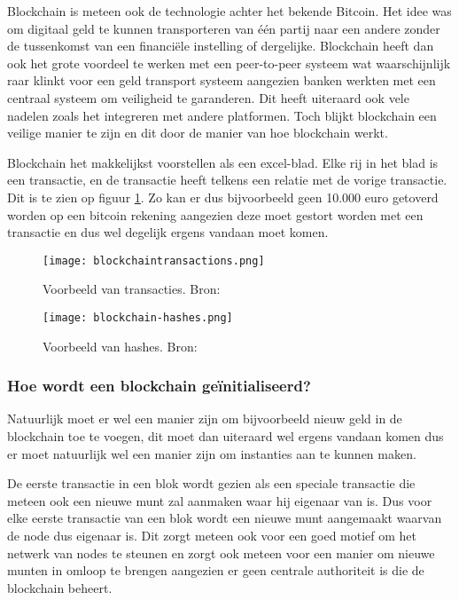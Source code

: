  Blockchain is meteen ook de technologie achter het bekende Bitcoin. Het idee was om digitaal geld te kunnen transporteren van één partij naar een andere zonder de tussenkomst van een financiële instelling of dergelijke. Blockchain heeft dan ook het grote voordeel te werken met een peer-to-peer systeem wat waarschijnlijk raar klinkt voor een geld transport systeem aangezien banken werkten met een centraal systeem om veiligheid te garanderen. Dit heeft uiteraard ook vele nadelen zoals het integreren met andere platformen. Toch blijkt blockchain een veilige manier te zijn en dit door de manier van hoe blockchain werkt.
 
 Blockchain het makkelijkst voorstellen als een excel-blad. Elke rij in het blad is een transactie, en de transactie heeft telkens een relatie met de vorige transactie. Dit is te zien op figuur \ref{fig:blockchain-transaction-example}. Zo kan er dus bijvoorbeeld geen 10.000 euro getoverd worden op een bitcoin rekening aangezien deze moet gestort worden met een transactie en dus wel degelijk ergens vandaan moet komen.
 
 \begin{figure}
 	\texttt{[image: blockchaintransactions.png]}
 	\caption{Voorbeeld van transacties. Bron: \textcite{Nakamoto2008} }
 	\label{fig:blockchain-transaction-example}
 \end{figure}
\begin{figure}
	\texttt{[image: blockchain-hashes.png]}
	\caption{Voorbeeld van hashes. Bron: \textcite{blockchain.info}}
	\label{fig:blockchain-hash-example}
\end{figure}

 \subsubsection{Hoe wordt een blockchain geïnitialiseerd?}
Natuurlijk moet er wel een manier zijn om bijvoorbeeld nieuw geld in de blockchain toe te voegen, dit moet dan uiteraard wel ergens vandaan komen dus er moet natuurlijk wel een manier zijn om instanties aan te kunnen maken. 

De eerste transactie in een blok wordt gezien als een speciale transactie die meteen ook een nieuwe munt zal aanmaken waar hij eigenaar van is. Dus voor elke eerste transactie van een blok wordt een nieuwe munt aangemaakt waarvan de node dus eigenaar is. Dit zorgt meteen ook voor een goed motief om het netwerk van nodes te steunen en zorgt ook meteen voor een manier om nieuwe munten in omloop te brengen aangezien er geen centrale authoriteit is die de blockchain beheert. 

